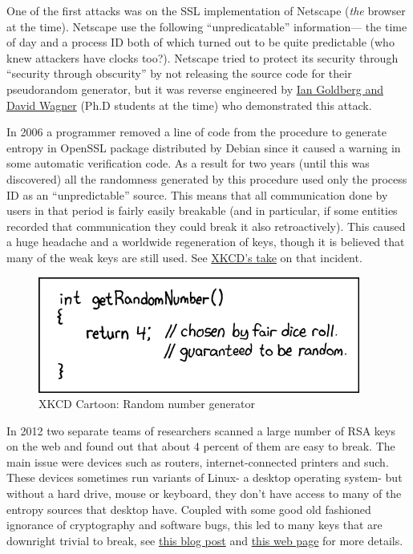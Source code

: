 One of the first attacks was on the SSL implementation of Netscape
(\emph{the} browser at the time). Netscape use the following
``unpredicatable'' information--- the time of day and a process ID both
of which turned out to be quite predictable (who knew attackers have
clocks too?). Netscape tried to protect its security through ``security
through obscurity'' by not releasing the source code for their
pseudorandom generator, but it was reverse engineered by
\href{https://www.cs.berkeley.edu/~daw/papers/ddj-netscape.html}{Ian
Goldberg and David Wagner} (Ph.D students at the time) who demonstrated
this attack.

In 2006 a programmer removed a line of code from the procedure to
generate entropy in OpenSSL package distributed by Debian since it
caused a warning in some automatic verification code. As a result for
two years (until this was discovered) all the randomness generated by
this procedure used only the process ID as an ``unpredictable'' source.
This means that all communication done by users in that period is fairly
easily breakable (and in particular, if some entities recorded that
communication they could break it also retroactively). This caused a
huge headache and a worldwide regeneration of keys, though it is
believed that many of the weak keys are still used. See
\href{http://www.xkcd.com/424/}{XKCD's take} on that incident.


\begin{figure}
\centering
\includegraphics[width=\textwidth, height=0.25\paperheight, keepaspectratio]{../figure/random_number.png}
\caption{XKCD Cartoon: Random number generator}
\label{tmplabelfig}
\end{figure}

In 2012 two separate teams of researchers scanned a large number of RSA
keys on the web and found out that about 4 percent of them are easy to
break. The main issue were devices such as routers, internet-connected
printers and such. These devices sometimes run variants of Linux- a
desktop operating system- but without a hard drive, mouse or keyboard,
they don't have access to many of the entropy sources that desktop have.
Coupled with some good old fashioned ignorance of cryptography and
software bugs, this led to many keys that are downright trivial to
break, see
\href{https://freedom-to-tinker.com/blog/nadiah/new-research-theres-no-need-panic-over-factorable-keys-just-mind-your-ps-and-qs/}{this
blog post} and \href{https://factorable.net/}{this web page} for more
details.

